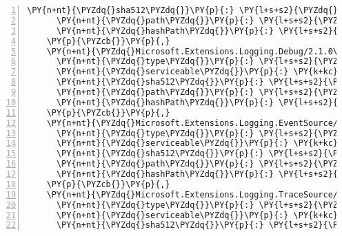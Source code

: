 \begin{Verbatim}[commandchars=\\\{\},numbers=left,firstnumber=1,stepnumber=1,numberblanklines=0]
      \PY{n+nt}{\PYZdq{}sha512\PYZdq{}}\PY{p}{:} \PY{l+s+s2}{\PYZdq{}sha512\PYZhy{}t20rsmALlPBkjUgtjpFT195C2dyIGGzBn/0cP6TX6Cs31NFhySSkxdghT4+wbj8im97d//K6gzTL1jwdKL3C1w==\PYZdq{}}\PY{p}{,}
      \PY{n+nt}{\PYZdq{}path\PYZdq{}}\PY{p}{:} \PY{l+s+s2}{\PYZdq{}microsoft.extensions.logging.console/2.1.0\PYZhy{}rc1\PYZhy{}final\PYZdq{}}\PY{p}{,}
      \PY{n+nt}{\PYZdq{}hashPath\PYZdq{}}\PY{p}{:} \PY{l+s+s2}{\PYZdq{}microsoft.extensions.logging.console.2.1.0\PYZhy{}rc1\PYZhy{}final.nupkg.sha512\PYZdq{}}
    \PY{p}{\PYZcb{}}\PY{p}{,}
    \PY{n+nt}{\PYZdq{}Microsoft.Extensions.Logging.Debug/2.1.0\PYZhy{}rc1\PYZhy{}final\PYZdq{}}\PY{p}{:} \PY{p}{\PYZob{}}
      \PY{n+nt}{\PYZdq{}type\PYZdq{}}\PY{p}{:} \PY{l+s+s2}{\PYZdq{}package\PYZdq{}}\PY{p}{,}
      \PY{n+nt}{\PYZdq{}serviceable\PYZdq{}}\PY{p}{:} \PY{k+kc}{true}\PY{p}{,}
      \PY{n+nt}{\PYZdq{}sha512\PYZdq{}}\PY{p}{:} \PY{l+s+s2}{\PYZdq{}sha512\PYZhy{}kDQjdCKCWrUnYOrayM0G8cU5t7YC87mwxD/VdtMWEja7UI5rl3DVfGLSDDuMN4t5VtdGkRmkuDAYP6NHKKhZeQ==\PYZdq{}}\PY{p}{,}
      \PY{n+nt}{\PYZdq{}path\PYZdq{}}\PY{p}{:} \PY{l+s+s2}{\PYZdq{}microsoft.extensions.logging.debug/2.1.0\PYZhy{}rc1\PYZhy{}final\PYZdq{}}\PY{p}{,}
      \PY{n+nt}{\PYZdq{}hashPath\PYZdq{}}\PY{p}{:} \PY{l+s+s2}{\PYZdq{}microsoft.extensions.logging.debug.2.1.0\PYZhy{}rc1\PYZhy{}final.nupkg.sha512\PYZdq{}}
    \PY{p}{\PYZcb{}}\PY{p}{,}
    \PY{n+nt}{\PYZdq{}Microsoft.Extensions.Logging.EventSource/2.1.0\PYZhy{}rc1\PYZhy{}final\PYZdq{}}\PY{p}{:} \PY{p}{\PYZob{}}
      \PY{n+nt}{\PYZdq{}type\PYZdq{}}\PY{p}{:} \PY{l+s+s2}{\PYZdq{}package\PYZdq{}}\PY{p}{,}
      \PY{n+nt}{\PYZdq{}serviceable\PYZdq{}}\PY{p}{:} \PY{k+kc}{true}\PY{p}{,}
      \PY{n+nt}{\PYZdq{}sha512\PYZdq{}}\PY{p}{:} \PY{l+s+s2}{\PYZdq{}sha512\PYZhy{}9D+0zN0Wk7amwGB+Vf046xqPS+JQ8W3LZzFbx+76iBGYzFPa+FCXJ59E0SrrtTtjNIiWy8rH0FP87TgQw9TpkA==\PYZdq{}}\PY{p}{,}
      \PY{n+nt}{\PYZdq{}path\PYZdq{}}\PY{p}{:} \PY{l+s+s2}{\PYZdq{}microsoft.extensions.logging.eventsource/2.1.0\PYZhy{}rc1\PYZhy{}final\PYZdq{}}\PY{p}{,}
      \PY{n+nt}{\PYZdq{}hashPath\PYZdq{}}\PY{p}{:} \PY{l+s+s2}{\PYZdq{}microsoft.extensions.logging.eventsource.2.1.0\PYZhy{}rc1\PYZhy{}final.nupkg.sha512\PYZdq{}}
    \PY{p}{\PYZcb{}}\PY{p}{,}
    \PY{n+nt}{\PYZdq{}Microsoft.Extensions.Logging.TraceSource/2.1.0\PYZhy{}rc1\PYZhy{}final\PYZdq{}}\PY{p}{:} \PY{p}{\PYZob{}}
      \PY{n+nt}{\PYZdq{}type\PYZdq{}}\PY{p}{:} \PY{l+s+s2}{\PYZdq{}package\PYZdq{}}\PY{p}{,}
      \PY{n+nt}{\PYZdq{}serviceable\PYZdq{}}\PY{p}{:} \PY{k+kc}{true}\PY{p}{,}
      \PY{n+nt}{\PYZdq{}sha512\PYZdq{}}\PY{p}{:} \PY{l+s+s2}{\PYZdq{}sha512\PYZhy{}NCeXY70d7DQSwmP8YIOfsh0npmWQiKZSHmOkm8tQdJA8oY/Pyg69SdCd8r4VsDnlfObhecpQnT4/lbo/NGhUQw==\PYZdq{}}\PY{p}{,}

\end{Verbatim}
